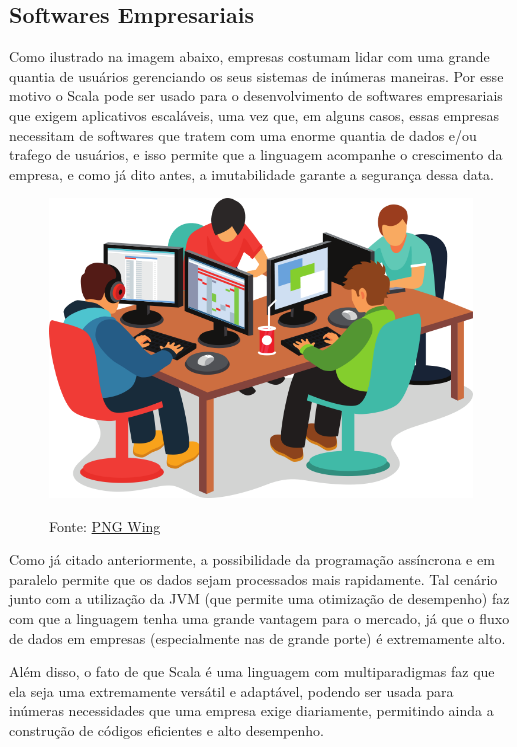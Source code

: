 		 \subsection{Softwares Empresariais}
		 Como ilustrado na imagem abaixo, empresas costumam lidar com uma grande quantia de usuários gerenciando os seus sistemas de inúmeras maneiras. Por esse motivo o Scala pode ser usado para o desenvolvimento de softwares empresariais que exigem aplicativos escaláveis, uma vez que, em alguns casos, essas empresas necessitam de softwares que tratem com uma enorme quantia de dados e/ou trafego de usuários, e isso permite que a linguagem acompanhe o crescimento da empresa, e como já dito antes, a imutabilidade garante a segurança dessa data.
		 
		\begin{figure}[H]
			\centering
			\includegraphics[width=0.7\linewidth]{Pictures/Empresario}
			\caption{}
			\label{fig:empresario}
			Fonte: \href{https://www.pngwing.com/pt}{PNG Wing}
		\end{figure}
		
		Como já citado anteriormente, a possibilidade da programação assíncrona e em paralelo permite que os dados sejam processados mais rapidamente. Tal cenário junto com a utilização da JVM (que permite uma otimização de desempenho) faz com que a linguagem tenha uma grande vantagem para o mercado, já que o fluxo de dados em empresas (especialmente nas de grande porte) é extremamente alto.
		
		Além disso, o fato de que Scala é uma linguagem com multiparadigmas faz que ela seja uma extremamente versátil e adaptável, podendo ser usada para inúmeras necessidades que uma empresa exige diariamente, permitindo ainda a construção de códigos eficientes e alto desempenho. 
		
